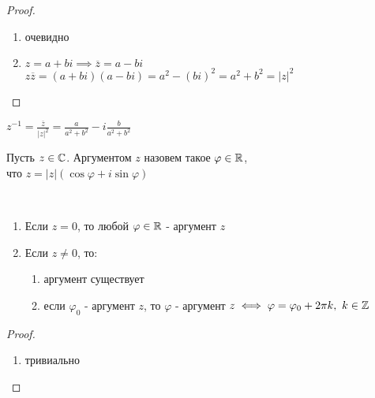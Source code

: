 \begin{normalsize}
\begin{proof}
\begin{enumerate}
        \item очевидно
        
        \item $z = a + bi \implies \overline{z} = a - bi$\\
        $z \overline{z} = (a + bi)(a - bi) = a^2 - (bi)^2 = a^2 + b^2 = |z|^2$
    \end{enumerate}
\end{proof}

\begin{notice}
    $z^{-1} = \frac{\overline{z}}{|z|^2} = \frac{a}{a^2 + b^2} - i\frac{b}{a^2 + b^2}$
\end{notice}

\begin{defn}
    Пусть $z \in \mathbb{C}$. Аргументом $z$ назовем такое $\varphi \in \mathbb{R}$, \\
    что $z = |z|(\cos\varphi + i\sin\varphi)$
\end{defn}

\begin{theorem-non}~
    \begin{enumerate}
        \item Если $z = 0$, то любой $\varphi \in \mathbb{R}$ - аргумент $z$
        \item Если $z \neq 0$, то:
        \begin{enumerate}
            \item аргумент существует
            \item если $\varphi_0$ - аргумент $z$, то $\varphi$ - аргумент $z \iff \varphi = \varphi_0 + 2 \pi k,~k \in \mathbb{Z}$\\
        \end{enumerate}
    \end{enumerate}
\end{theorem-non}

\begin{proof}
    \begin{enumerate}
        \item тривиально
        

\end{enumerate}
\end{proof}
\end{normalsize}
